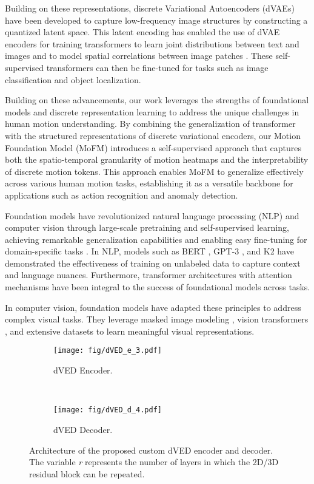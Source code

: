 Building on these representations, discrete Variational Autoencoders (dVAEs) \cite{RameshZSdVAE, VqVAE, VqVAE2, jang2017categorical} have been developed to capture low-frequency image structures by constructing a quantized latent space. This latent encoding has enabled the use of dVAE encoders for training transformers to learn joint distributions between text and images \cite{RameshZSdVAE} and to model spatial correlations between image patches \cite{dosovitskiy2021an, bao2022beit}. These self-supervised transformers can then be fine-tuned for tasks such as image classification and object localization.

Building on these advancements, our work leverages the strengths of foundational models and discrete representation learning to address the unique challenges in human motion understanding. By combining the generalization of transformer with the structured representations of discrete variational encoders, our Motion Foundation Model (MoFM) introduces a self-supervised approach that captures both the spatio-temporal granularity of motion heatmaps and the interpretability of discrete motion tokens. This approach enables MoFM to generalize effectively across various human motion tasks, establishing it as a versatile backbone for applications such as action recognition and anomaly detection.

Foundation models have revolutionized natural language processing (NLP) and computer vision through large-scale pretraining and self-supervised learning, achieving remarkable generalization capabilities and enabling easy fine-tuning for domain-specific tasks \cite{Devlin2019BERTPO, brown2020language, myers2024foundation}. In NLP, models such as BERT \cite{Devlin2019BERTPO}, GPT-3 \cite{brown2020language}, and K2 \cite{deng2024k2} have demonstrated the effectiveness of training on unlabeled data to capture context and language nuances. Furthermore, transformer architectures with attention mechanisms \cite{vaswani2017attention, dosovitskiy2021an} have been integral to the success of foundational models across tasks.

In computer vision, foundation models \cite{kirillov2023segment, chen2022internvl} have adapted these principles to address complex visual tasks. They leverage masked image modeling \cite{bao2021beit}, vision transformers \cite{dosovitskiy2021an}, and extensive datasets to learn meaningful visual representations.


\begin{figure}[t]
    \centering
    \begin{subfigure}[b]{\linewidth}
        \texttt{[image: fig/dVED\_e\_3.pdf]}
        \caption{dVED Encoder.}
        \label{fig:dvede}
    \end{subfigure}
    \\
    \begin{subfigure}[b]{\linewidth}
        \texttt{[image: fig/dVED\_d\_4.pdf]}
        \caption{dVED Decoder.}
        \label{fig:dvedd}
    \end{subfigure}
    \caption{Architecture of the proposed custom dVED encoder and decoder. The variable \textit{r} represents the number of layers in which the 2D/3D residual block can be repeated.}
    \label{fig:dved}
\end{figure}